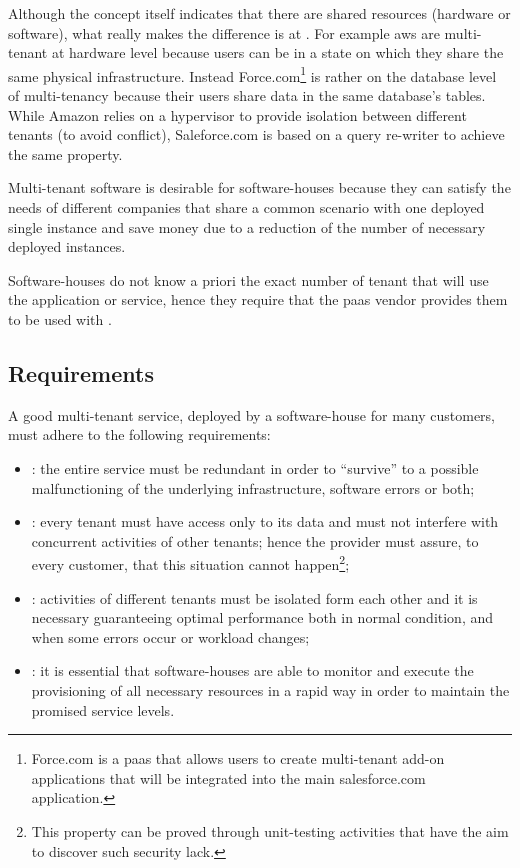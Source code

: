 Although the concept itself indicates that there are shared resources (hardware or software), what really
makes the difference is at . For example \ac{aws} are
multi-tenant at hardware level because users can be in a state on which they share the same physical
infrastructure. Instead Force.com\footnote{Force.com is a \ac{paas} that allows users to create
multi-tenant add-on applications that will be integrated into the main salesforce.com application.} is rather on
the database level of multi-tenancy because their users share data in the same database's tables. While
Amazon relies on a hypervisor to provide isolation between different tenants (to avoid conflict),
Saleforce.com is based on a query re-writer to achieve the same property.

Multi-tenant software is desirable for software-houses because they can satisfy the needs of different
companies that share a common scenario with one deployed single instance and save money due to a
reduction of the number of necessary deployed instances. 

Software-houses do not know a priori the exact number of tenant that will use the application or service,
hence they require that the \ac{paas} vendor provides them  to be used
with .

\subsection{Requirements}
\label{sec:elasticity-multiTenancy-requirements}
A good multi-tenant service, deployed by a software-house for many customers, must adhere to the following
requirements:

\begin{itemize}
	\item{: the entire service must be redundant in order to ``survive'' to a possible
		malfunctioning of the underlying infrastructure, software errors or both;}
	\item{: every tenant must have access only to its data and must not interfere
		with concurrent activities of other tenants; hence the provider must assure, to every customer, that this
		situation cannot happen\footnote{This property can be proved through unit-testing activities that have the
		aim to discover such security lack.};}
	\item{: activities of different tenants must be isolated form each other and it
		is necessary guaranteeing optimal performance both in normal condition, and when some errors occur or workload
		changes;}
	\item{: it is essential that software-houses are able to monitor and execute the
		provisioning of all necessary resources in a rapid way in order to maintain the promised service levels.}
\end{itemize}

